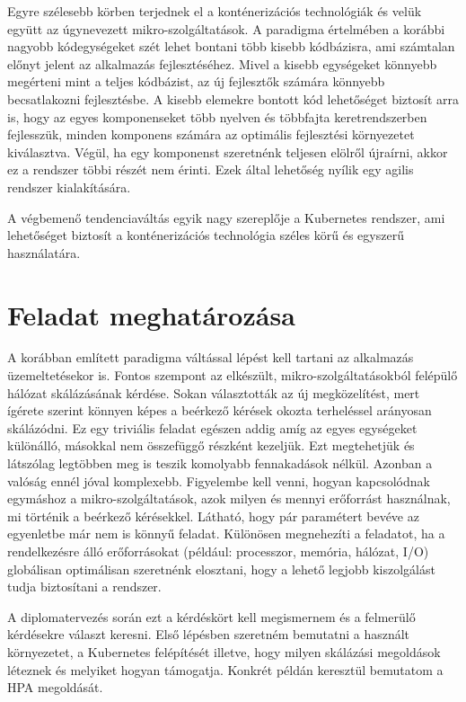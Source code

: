 Egyre szélesebb körben terjednek el a konténerizációs technológiák és velük együtt az úgynevezett mikro-szolgáltatások.
A paradigma értelmében a korábbi nagyobb kódegységeket szét lehet bontani több kisebb kódbázisra, ami számtalan előnyt jelent az alkalmazás fejlesztéséhez.
Mivel a kisebb egységeket könnyebb megérteni mint a teljes kódbázist, az új fejlesztők számára könnyebb becsatlakozni fejlesztésbe.
A kisebb elemekre bontott kód lehetőséget biztosít arra is, hogy az egyes komponenseket több
nyelven és többfajta keretrendszerben fejlesszük, minden komponens számára az optimális fejlesztési környezetet kiválasztva. 
Végül, ha egy komponenst szeretnénk teljesen elölről újraírni, akkor ez a rendszer többi részét nem érinti.
Ezek által lehetőség nyílik egy agilis rendszer kialakítására.

A végbemenő tendenciaváltás egyik nagy szereplője a Kubernetes rendszer, ami lehetőséget biztosít a konténerizációs technológia széles körű és egyszerű használatára.

\section{Feladat meghatározása}
A korábban említett paradigma váltással lépést kell tartani az alkalmazás üzemeltetésekor is. 
Fontos szempont az elkészült, mikro-szolgáltatásokból felépülő hálózat skálázásának kérdése. 
Sokan választották az új megközelítést, mert ígérete szerint könnyen képes a beérkező kérések okozta terheléssel arányosan skálázódni.
Ez egy triviális feladat egészen addig amíg az egyes egységeket különálló, másokkal nem összefüggő részként kezeljük.
Ezt megtehetjük és látszólag legtöbben meg is teszik komolyabb fennakadások nélkül. 
Azonban a valóság ennél jóval komplexebb. Figyelembe kell venni, hogyan kapcsolódnak egymáshoz a mikro-szolgáltatások, azok milyen és mennyi erőforrást használnak, mi történik a beérkező kérésekkel.
Látható, hogy pár paramétert bevéve az egyenletbe már nem is könnyű feladat. 
Különösen megnehezíti a feladatot, ha a rendelkezésre álló erőforrásokat (például: processzor, memória, hálózat, I/O) globálisan optimálisan szeretnénk elosztani, hogy a lehető legjobb kiszolgálást tudja biztosítani a rendszer. 

A diplomatervezés során ezt a kérdéskört kell megismernem és a felmerülő kérdésekre választ keresni. 
Első lépésben szeretném bemutatni a használt környezetet, a Kubernetes felépítését illetve, hogy
milyen skálázási megoldások léteznek és melyiket hogyan támogatja.
Konkrét példán keresztül bemutatom a HPA megoldását. 

